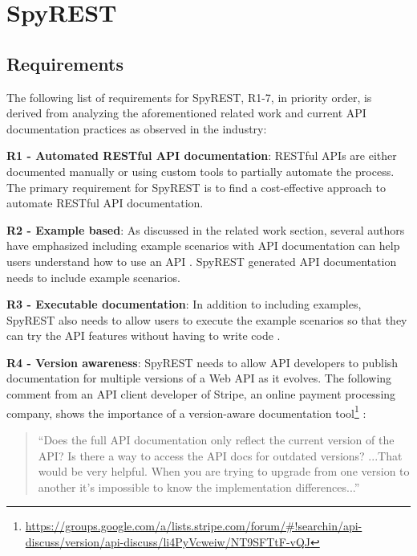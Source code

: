 \section{SpyREST} %
\label{sec:spyrest}

\subsection{Requirements} %
\label{sub:spyrest_requirements}

The following list of requirements for SpyREST, R1-7, in priority order, is derived from analyzing the aforementioned related work and current API documentation practices as observed in the industry:

  \textbf{R1 - Automated RESTful API documentation}: RESTful APIs are either documented manually or using custom tools to partially automate the process. The primary requirement for SpyREST is to find a cost-effective approach to automate RESTful API documentation.

  \textbf{R2 - Example based}: As discussed in the related work section, several authors have emphasized including example scenarios with API documentation can help users understand how to use an API \cite{Robillard_what_makes, Kuhn_on_designing, Hoffman_api_documentation,Nasehi_what_makes}. SpyREST generated API documentation needs to include example scenarios.

  \textbf{R3 - Executable documentation}: In addition to including examples, SpyREST also needs to allow users to execute the example scenarios so that they can try the API features without having to write code \cite{Hoffman_api_documentation, Myers_study}.

  \textbf{R4 - Version awareness}: SpyREST needs to allow API developers to publish documentation for multiple versions of a Web API as it evolves. The following comment from an API client developer of Stripe, an online payment processing company, shows the importance of a version-aware documentation tool\footnote{\url{https://groups.google.com/a/lists.stripe.com/forum/\#!searchin/api-discuss/version/api-discuss/li4PyVcweiw/NT9SFTtF-vQJ}}
:
  \small
  \begin{quotation}
   ``Does the full API documentation only reflect the current version of the
    API?  Is there a way to access the API docs for outdated versions? ...That would be very helpful. When you are trying to upgrade from one version to another it's impossible to know the implementation differences...''
  \end{quotation}
  \normalsize

